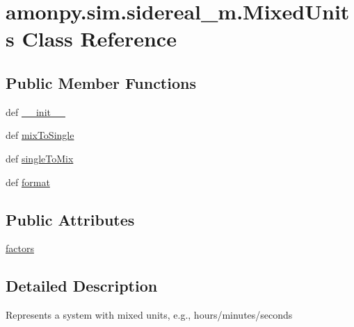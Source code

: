 \hypertarget{classamonpy_1_1sim_1_1sidereal__m_1_1_mixed_units}{\section{amonpy.\-sim.\-sidereal\-\_\-m.\-Mixed\-Units Class Reference}
\label{classamonpy_1_1sim_1_1sidereal__m_1_1_mixed_units}
}
\subsection*{Public Member Functions}
\begin{DoxyCompactItemize}
\item 
def \hyperlink{classamonpy_1_1sim_1_1sidereal__m_1_1_mixed_units_a4d96c16c38fe8d5692575dd38ecaddec}{\-\_\-\-\_\-init\-\_\-\-\_\-}
\item 
def \hyperlink{classamonpy_1_1sim_1_1sidereal__m_1_1_mixed_units_a4fe739625b70de3fb0c01d017878e8d8}{mix\-To\-Single}
\item 
def \hyperlink{classamonpy_1_1sim_1_1sidereal__m_1_1_mixed_units_a7a02893781159a2fbac8cbc4eb3d9357}{single\-To\-Mix}
\item 
def \hyperlink{classamonpy_1_1sim_1_1sidereal__m_1_1_mixed_units_ae43dcbf9d4fb7750a98ad1b2227c8fd4}{format}
\end{DoxyCompactItemize}
\subsection*{Public Attributes}
\begin{DoxyCompactItemize}
\item 
\hyperlink{classamonpy_1_1sim_1_1sidereal__m_1_1_mixed_units_a71db4a07fcb2df239489b903bfa86c86}{factors}
\end{DoxyCompactItemize}


\subsection{Detailed Description}
\begin{DoxyVerb}Represents a system with mixed units, e.g., hours/minutes/seconds
\end{DoxyVerb}
 

